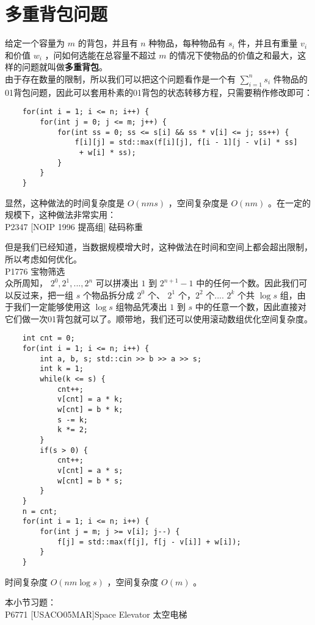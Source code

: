 \documentclass{beamer}
\newcommand{\fdf}[1]{\alert{\textbf{#1}}}
\begin{document}
\section{多重背包问题}
\begin{frame}[fragile]
给定一个容量为 $m$ 的背包，并且有 $n$ 种物品，每种物品有 $s_i$ 件，并且有重量 $v_i$ 和价值 $w_i$ ，问如何选能在总容量不超过 $m$ 的情况下使物品的价值之和最大，这样的问题就叫做\fdf{多重背包}。 \\ 
由于存在数量的限制，所以我们可以把这个问题看作是一个有 $\sum_{i = 1}^{n}s_i$ 件物品的01背包问题，因此可以套用朴素的01背包的状态转移方程，只需要稍作修改即可：
\begin{onlyenv}
\begin{verbatim}
    for(int i = 1; i <= n; i++) {
        for(int j = 0; j <= m; j++) {
            for(int ss = 0; ss <= s[i] && ss * v[i] <= j; ss++) {
                f[i][j] = std::max(f[i][j], f[i - 1][j - v[i] * ss]
                 + w[i] * ss);
            }
        }
    }
\end{verbatim}
\end{onlyenv}
显然，这种做法的时间复杂度是 $O(nms)$ ，空间复杂度是 $O(nm)$ 。在一定的规模下，这种做法非常实用：\\ 
P2347 [NOIP 1996 提高组] 砝码称重
\end{frame}
\begin{frame}
但是我们已经知道，当数据规模增大时，这种做法在时间和空间上都会超出限制，所以考虑如何优化。\\ 
P1776 宝物筛选\\
众所周知， $2^0, 2^1, ..., 2^n$ 可以拼凑出 $1$ 到 $2^{n + 1} - 1$ 中的任何一个数。因此我们可以反过来，把一组 $s$ 个物品拆分成 $2^0$ 个、 $2^1$ 个，$2^2$ 个.... $2^k$ 个共 $\log s$ 组，由于我们一定能够使用这 $\log s$ 组物品凭凑出 $1$ 到 $s$ 中的任意一个数，因此直接对它们做一次01背包就可以了。顺带地，我们还可以使用滚动数组优化空间复杂度。
\end{frame}
\begin{frame}[fragile]
\begin{onlyenv}
\begin{verbatim}
    int cnt = 0;
    for(int i = 1; i <= n; i++) {
        int a, b, s; std::cin >> b >> a >> s;
        int k = 1;
        while(k <= s) {
            cnt++;
            v[cnt] = a * k;
            w[cnt] = b * k;
            s -= k;
            k *= 2;
        }
        if(s > 0) {
            cnt++;
            v[cnt] = a * s;
            w[cnt] = b * s;
        }
    }
    n = cnt;
    for(int i = 1; i <= n; i++) {
        for(int j = m; j >= v[i]; j--) {
            f[j] = std::max(f[j], f[j - v[i]] + w[i]);
        }
    }
\end{verbatim}
\end{onlyenv}
时间复杂度 $O(nm \log s)$ ，空间复杂度 $O(m)$ 。
\end{frame}
\begin{frame}
本小节习题：\\ 
P6771 [USACO05MAR]Space Elevator 太空电梯\\ 
\end{frame}
\end{document}
